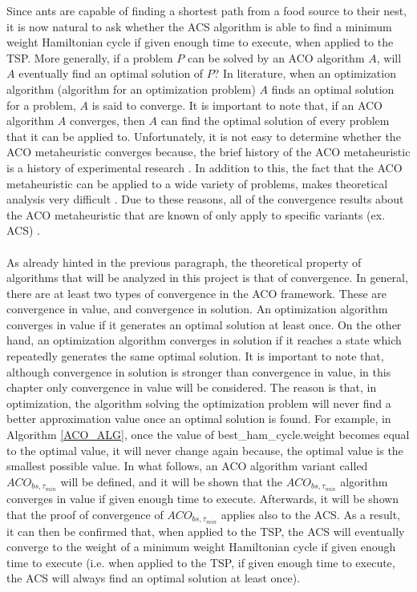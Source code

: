 \documentclass[12pt]{article}
\numberwithin{equation}{subsection}
\numberwithin{table}{subsection}
\numberwithin{algorithm}{subsection}
\numberwithin{figure}{subsection}
\begin{document}
Since ants are capable of finding a shortest path from a food source to their nest, it is now natural to ask whether the ACS algorithm is able to find a minimum weight Hamiltonian cycle if given enough time to execute, when applied to the TSP. More generally, if a problem $P$ can be solved by an ACO algorithm $A$, will $A$ eventually find an optimal solution of $P$? In literature, when an optimization algorithm (algorithm for an optimization problem) $A$ finds an optimal solution for a problem, $A$ is said to converge. It is important to note that, if an ACO algorithm $A$ converges, then $A$ can find the optimal solution of every problem that it can be applied to. Unfortunately, it is not easy to determine whether the ACO metaheuristic converges because, the brief history of the ACO metaheuristic is a history of experimental research \cite{dorigo_stutzle_thomas_2004}. In addition to this, the fact that the ACO metaheuristic can be applied to a wide variety of problems, makes theoretical analysis very difficult \cite{dorigo_stutzle_thomas_2004}. Due to these reasons, all of the convergence results about the ACO metaheuristic that are known of only apply to specific variants (ex. ACS) \cite{dorigo_stutzle_thomas_2004}.\\\\
As already hinted in the previous paragraph, the theoretical property of algorithms that will be analyzed in this project is that of convergence. In general, there are at least two types of convergence in the ACO framework. These are convergence in value, and convergence in solution. An optimization algorithm converges in value if it generates an optimal solution at least once. On the other hand, an optimization algorithm converges in solution if it reaches a state which repeatedly generates the same optimal solution. It is important to note that, although convergence in solution is stronger than convergence in value, in this chapter only convergence in value will be considered. The reason is that, in optimization, the algorithm solving the optimization problem will never find a better approximation value once an optimal solution is found. For example, in Algorithm \ref{ACO_ALG}, once the value of best\_ham\_cycle.weight becomes equal to the optimal value, it will never change again because, the optimal value is the smallest possible value. In what follows, an ACO algorithm variant called $ACO_{bs, \tau_{min}}$ will be defined, and it will be shown that the $ACO_{bs, \tau_{min}}$ algorithm converges in value if given enough time to execute. Afterwards, it will be shown that the proof of convergence of $ACO_{bs, \tau_{min}}$ applies also to the ACS. As a result, it can then be confirmed that, when applied to the TSP, the ACS will eventually converge to the weight of a minimum weight Hamiltonian cycle if given enough time to execute (i.e. when applied to the TSP,  if given enough time to execute, the ACS will always find an optimal solution at least once). \cite{dorigo_stutzle_thomas_2004}\\\\
\end{document}
